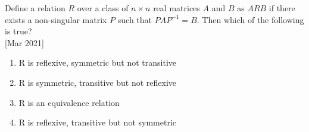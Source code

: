     \item{
        
            Define a relation $R$ over a class of $n \times n$ real matrices $A$ and $B$ as $A R B$ if  there exists a non-singular matrix $P$ such that $PAP^{-1} = B$. Then which of the following is true?\\ \text{ }
             \hfill
              {[Mar 2021]}
	              	\begin{enumerate}
	              		\item R is reflexive, symmetric but not transitive
	              		\item R is symmetric, transitive but not reflexive
	              		\item R is an equivalence relation
	              		\item R is reflexive, transitive but not symmetric
	              	\end{enumerate}
        
        }




